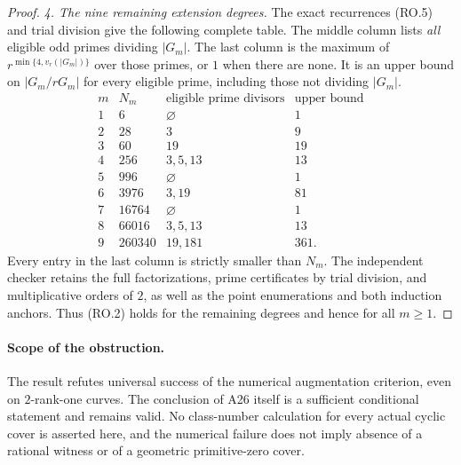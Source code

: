 \begin{proof}
\emph{4. The nine remaining extension degrees.}
The exact recurrences (RO.5) and trial division give the
following complete table.  The middle column lists
\emph{all} eligible odd primes dividing $|G_m|$.
The last column is the maximum of
$r^{\min\{4,v_r(|G_m|)\}}$ over those primes, or $1$
when there are none.  It is an upper bound on
$|G_m/rG_m|$ for every eligible prime, including those
not dividing $|G_m|$.
\[
\begin{array}{c|r|l|r}
m&N_m&\text{eligible prime divisors}&\text{upper bound}\\
\hline
1&6&\varnothing&1\\
2&28&3&9\\
3&60&19&19\\
4&256&3,5,13&13\\
5&996&\varnothing&1\\
6&3976&3,19&81\\
7&16764&\varnothing&1\\
8&66016&3,5,13&13\\
9&260340&19,181&361.
\end{array}
\tag{RO.13}
\]
Every entry in the last column is strictly smaller than
$N_m$.  The independent checker retains the full
factorizations, prime certificates by trial division,
and multiplicative orders of $2$, as well as the
point enumerations and both induction anchors.
Thus (RO.2) holds for the remaining degrees and hence
for all $m\ge1$.
\end{proof}

\paragraph{Scope of the obstruction.}
The result refutes universal success of the numerical
augmentation criterion, even on $2$-rank-one curves.
The conclusion of A26 itself is a sufficient conditional
statement and remains valid.
No class-number calculation for every actual cyclic
cover is asserted here, and the numerical failure does
not imply absence of a rational witness or of a geometric
primitive-zero cover.
